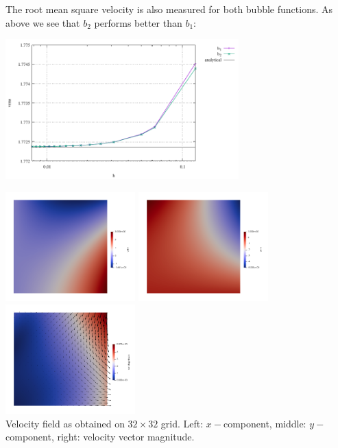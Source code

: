 The root mean square velocity is also measured for both bubble functions.
As above we see that $b_2$ performs better than $b_1$:
\begin{center}
\includegraphics[width=9cm]{python_codes/fieldstone_72/results/mms2/vrms}
\end{center}


\begin{center}
\includegraphics[width=5cm]{python_codes/fieldstone_72/results/mms2/u}
\includegraphics[width=5cm]{python_codes/fieldstone_72/results/mms2/v}
\includegraphics[width=5cm]{python_codes/fieldstone_72/results/mms2/vel}\\
{\captionfont Velocity field as obtained on $32\times 32$ grid. Left: $x-$component,
middle: $y-$component, right: velocity vector magnitude.}
\end{center}

